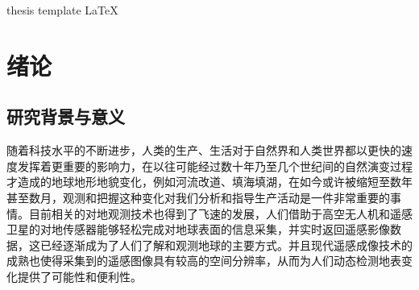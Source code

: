 \documentclass[lang=chs, degree=master, blindreview=false, adobe=false]{yanputhesis}
\begin{document}
\begin{engabstract}                                         %
    \noindent \blindtext                                    %
    \begin{engkeywords}                                     %
        thesis \ensep template \ensep \LaTeX                %
    \end{engkeywords}                                       %
\end{engabstract}                                           %
\tableofcontents                                            %
\listoffigures                                              %
\listoftables                                               %
\printnomenclature                                          %
\mainmatter
\sDefault
\chapter{绪论}
\section{研究背景与意义}
随着科技水平的不断进步，人类的生产、生活对于自然界和人类世界都以更快的速度发挥着更重要的影响力，在以往可能经过数十年乃至几个世纪间的自然演变过程才造成的地球地形地貌变化，例如河流改道、填海填湖，在如今或许被缩短至数年甚至数月，观测和把握这种变化对我们分析和指导生产活动是一件非常重要的事情。目前相关的对地观测技术也得到了飞速的发展，人们借助于高空无人机和遥感卫星的对地传感器能够轻松完成对地球表面的信息采集，并实时返回遥感影像数据，这已经逐渐成为了人们了解和观测地球的主要方式。并且现代遥感成像技术的成熟也使得采集到的遥感图像具有较高的空间分辨率，从而为人们动态检测地表变化提供了可能性和便利性。
\end{document}
